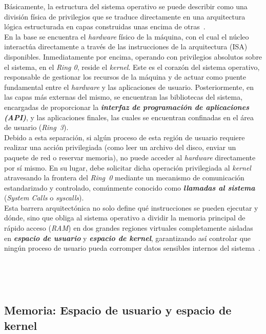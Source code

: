 Básicamente, la estructura del sistema operativo se puede describir como una división física de privilegios que se traduce directamente en una arquitectura lógica estructurada en capas construidas unas encima de otras~\cite{librossoo}.\\

En la base se encuentra el \textit{hardware} físico de la máquina, con el cual el núcleo interactúa directamente a través de las instrucciones de la arquitectura (ISA) disponibles.
Inmediatamente por encima, operando con privilegios absolutos sobre el sistema, en el \textit{Ring 0}, reside el \textit{kernel}. Este es el corazón del sistema operativo, responsable de gestionar los recursos de la máquina y de actuar como puente fundamental entre el \textit{hardware} y las aplicaciones de usuario.
Posteriormente, en las capas más externas del mismo, se encuentran las bibliotecas del sistema, encargadas de proporcionar la \textbf{\textit{interfaz de programación de aplicaciones (API)}}, y las aplicaciones finales, las cuales se encuentran confinadas en el área de usuario (\textit{Ring~3}).\\

Debido a esta separación, si algún proceso de esta región de usuario requiere realizar una acción privilegiada (como leer un archivo del disco, enviar un paquete de red o reservar memoria), no puede acceder al \textit{hardware} directamente por sí mismo.
En su lugar, debe solicitar dicha operación privilegiada al \textit{kernel} atravesando la frontera del \textit{Ring~0} mediante un mecanismo de comunicación estandarizado y controlado, comúnmente conocido como \textbf{\textit{llamadas al sistema}} (\textit{System Calls} o \textit{syscalls}).\\

Esta barrera arquitectónica no solo define qué instrucciones se pueden ejecutar y dónde, sino que obliga al sistema operativo a dividir la memoria principal de rápido acceso (\textit{RAM}) en dos grandes regiones virtuales completamente aisladas en \textbf{\textit{espacio de usuario}} y \textbf{\textit{espacio de kernel}},
garantizando así controlar que ningún proceso de usuario pueda corromper datos sensibles internos del sistema~\cite{love_linux, librossoo}.

\

\

\subsection{Memoria: Espacio de usuario y espacio de kernel}
\label{sec:uskrspaces}

